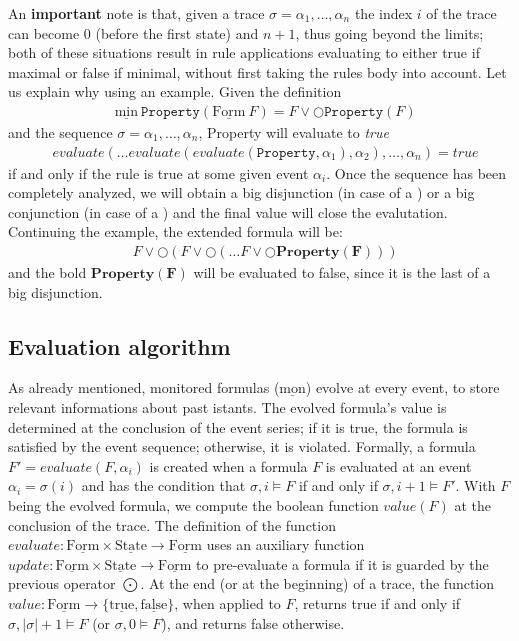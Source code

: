\documentclass[english]{article}
\begin{document}
An \textbf{important} note is that, given a trace $\sigma=\alpha_{1},\ldots ,\alpha_{n}$ the index $i$ of the trace can become $0$ (before the first state) and $n+1$, thus going beyond the limits; both of these situations result in rule applications evaluating to either true if maximal or false if minimal, without first taking the rules body into account. Let us explain why using an example. Given the definition 
\begin{align*}
    & \underline{\text{min}}\ \mathtt{Property}(\underline{\text{Form}}\ F) =F \lor \bigcirc \mathtt{Property}(F)
\end{align*}
and the sequence $\sigma=\alpha_{1},\ldots ,\alpha_{n}$, Property will evaluate to \textit{true} 
\begin{align*}
    & evaluate(\ldots evaluate(evaluate(\mathtt{Property},\alpha_1),\alpha_2),\ldots,\alpha_n)=true
\end{align*}
if and only if the rule is true at some given event $\alpha_i$. 
Once the sequence has been completely analyzed, we will obtain a big disjunction (in case of a \underline{}) or a big conjunction (in case of a \underline{}) and the final value will close the evalutation. Continuing the example, the extended formula will be:
\begin{align*}
    & F \lor \bigcirc(F \lor \bigcirc(\ldots F \lor \bigcirc \mathbf{Property(F)})) 
\end{align*}
and the bold $\mathbf{Property(F)}$ will be evaluated to false, since it is the last of a big disjunction.
\subsection{Evaluation algorithm}\label{algo}
As already mentioned, monitored formulas ($\underline{\text{mon}}$) evolve at every event, to store relevant informations about past istants. The evolved formula's value is determined at the conclusion of the event series; if it is true, the formula is satisfied by the event sequence; otherwise, it is violated. Formally, a formula $F' = evaluate(F, \alpha_i)$ is created when a formula $F$ is evaluated at an event $\alpha_i = \sigma(i)$ and has the condition that $\sigma, i \models F$ if and only if $\sigma, i+1 \models F'$. With $F$ being the evolved formula, we compute the boolean function $value(F)$ at the conclusion of the trace. The definition of the function $evaluate: \underline{\text{Form}} \times \underline{\text{State}} \to \underline{\text{Form}}$ uses an auxiliary function $update: \underline{\text{Form}} \times \underline{\text{State}} \to \underline{\text{Form}}$ to pre-evaluate a formula if it is guarded by the previous operator $\bigodot$. At the end (or at the beginning) of a trace, the
function $value : \underline{\text{Form}} \rightarrow \{ \underline{\text{true}}, \underline{\text{false}} \}$, when applied to $F$, returns true if and only if $\sigma,|\sigma|+1 \models F$ (or $\sigma,0 \models F$), and returns false otherwise.
\end{document}
